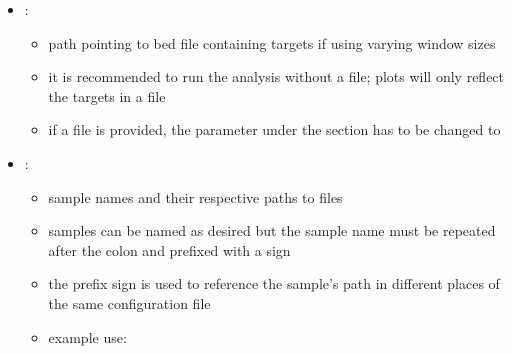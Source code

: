 \documentclass[letterpaper,10pt,english]{sphinxhowto}
\begin{document}
\begin{itemize}
\begin{itemize}
\begin{itemize}
\begin{itemize}
\end{itemize}

\end{itemize}

\end{itemize}

\item {} 
\sphinxAtStartPar
{}:
\begin{itemize}
\item {} 
\sphinxAtStartPar
path pointing to bed file containing targets if using varying window sizes

\item {} 
\sphinxAtStartPar
it is recommended to run the analysis without a  file; plots will only reflect the targets in a  file

\item {} 
\sphinxAtStartPar
if a  file is provided, the  parameter under the  section has to be changed to 

\end{itemize}

\item {} 
\sphinxAtStartPar
{}:
\begin{itemize}
\item {} 
\sphinxAtStartPar
sample names and their respective paths to  files

\item {} 
\sphinxAtStartPar
samples can be named as desired but the sample name must be repeated after the colon and prefixed with a \sphinxtitleref{\&} sign

\item {} 
\sphinxAtStartPar
the \sphinxtitleref{\&} prefix sign is used to reference the sample’s path in different places of the same configuration file

\item {} 
\sphinxAtStartPar
example use:

\end{itemize}

\end{itemize}
\end{document}
